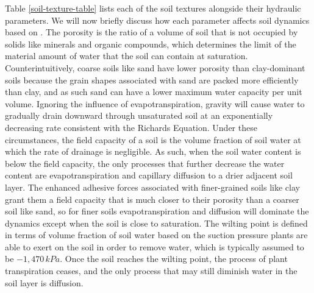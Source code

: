 Table \ref{soil-texture-table} lists each of the soil textures alongside their hydraulic parameters. We will now briefly discuss how each parameter affects soil dynamics based on \citep{dingman_physical_2014}. The porosity is the ratio of a volume of soil that is not occupied by solids like minerals and organic compounds, which determines the limit of the material amount of water that the soil can contain at saturation. Counterintuitively, coarse soils like sand have lower porosity than clay-dominant soils because the grain shapes associated with sand are packed more efficiently than clay, and as such sand can have a lower maximum water capacity per unit volume. Ignoring the influence of evapotranspiration, gravity will cause water to gradually drain downward through unsaturated soil at an exponentially decreasing rate consistent with the Richards Equation. Under these circumstances, the field capacity of a soil is the volume fraction of soil water at which the rate of drainage is negligible. As such, when the soil water content is below the field capacity, the only processes that further decrease the water content are evapotranspiration and capillary diffusion to a drier adjacent soil layer. The enhanced adhesive forces associated with finer-grained soils like clay grant them a field capacity that is much closer to their porosity than a coarser soil like sand, so for finer soils evapotranspiration and diffusion will dominate the dynamics except when the soil is close to saturation. The wilting point is defined in terms of volume fraction of soil water based on the suction pressure plants are able to exert on the soil in order to remove water, which is typically assumed to be $-1,470\,kPa$. Once the soil reaches the wilting point, the process of plant transpiration ceases, and the only process that may still diminish water in the soil layer is diffusion.

